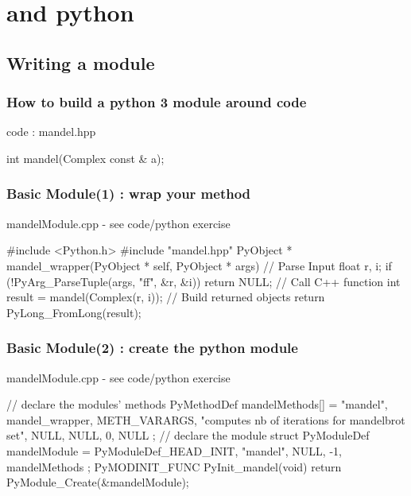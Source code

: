 \section[py]{\cpp and python}

\subsection[module]{Writing a module}

\begin{frame}[fragile]
  \frametitle{How to build a python 3 module around \cpp code}
  \begin{block}{\cpp code : mandel.hpp}
    \begin{cppcode*}{}
      int mandel(Complex const & a);
    \end{cppcode*}
  \end{block}
\end{frame}

\begin{frame}[fragile]
  \frametitle{Basic Module(1) : wrap your method}
  \begin{block}{mandelModule.cpp - see code/python exercise}
    \begin{cppcode*}{}
      #include <Python.h>
      #include "mandel.hpp"
      PyObject * mandel_wrapper(PyObject * self,
                                PyObject * args) {
        // Parse Input
        float r, i;
        if (!PyArg_ParseTuple(args, "ff", &r, &i))
          return NULL;
        // Call C++ function
        int result = mandel(Complex(r, i));
        // Build returned objects
        return PyLong_FromLong(result);
      }
    \end{cppcode*}
  \end{block}
\end{frame}

\begin{frame}[fragile]
  \frametitle{Basic Module(2) : create the python module}
  \begin{block}{mandelModule.cpp - see code/python exercise}
    \begin{cppcode*}{}
      // declare the modules' methods
      PyMethodDef mandelMethods[] = {
          {"mandel", mandel_wrapper, METH_VARARGS,
          "computes nb of iterations for mandelbrot set"},
          {NULL, NULL, 0, NULL}
      };
      // declare the module
      struct PyModuleDef mandelModule = {
        PyModuleDef_HEAD_INIT,
        "mandel", NULL, -1, mandelMethods
      };
      PyMODINIT_FUNC PyInit_mandel(void) {
        return PyModule_Create(&mandelModule);
      }
    \end{cppcode*}
  \end{block}
\end{frame}

